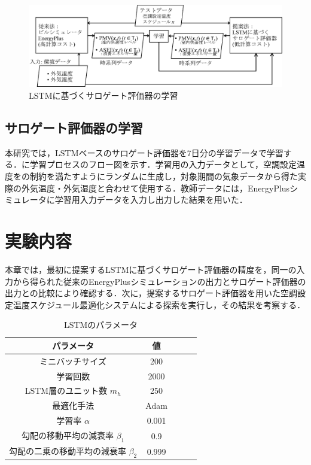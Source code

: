 \begin{figure}[ht]
  \begin{center}
    \includegraphics[width=1.1\linewidth]{fig/surrogate_learn_system.eps}
  \end{center}
  \caption{LSTMに基づくサロゲート評価器の学習}
  \label{fig::surrogate_learn_system}
\end{figure}

\subsection{サロゲート評価器の学習}
本研究では，LSTMベースのサロゲート評価器を7日分の学習データで学習する．に学習プロセスのフロー図を示す．学習用の入力データとして，空調設定温度をの制約を満たすようにランダムに生成し，対象期間の気象データから得た実際の外気温度・外気湿度と合わせて使用する．教師データには，EnergyPlusシミュレータに学習用入力データを入力し出力した結果を用いた．

\section{実験内容}
本章では，最初に提案するLSTMに基づくサロゲート評価器の精度を，同一の入力から得られた従来のEnergyPlusシミュレーションの出力とサロゲート評価器の出力との比較により確認する．次に，提案するサロゲート評価器を用いた空調設定温度スケジュール最適化システムによる探索を実行し，その結果を考察する．

\begin{table}[t]
  \begin{center}
    \caption{LSTMのパラメータ}
    \label{tab::surrogate_param_lstm}
    \begin{tabular}{c|cccc}
      \hline
      パラメータ                             & 値    \\
      \hline \hline
      ミニバッチサイズ                       & 200   \\
      学習回数                               & 2000  \\
      LSTM層のユニット数 $m_h$               & 250   \\
      最適化手法                             & Adam  \\
      学習率 $\alpha$                        & 0.001 \\
      勾配の移動平均の減衰率 $\beta_1$       & 0.9   \\
      勾配の二乗の移動平均の減衰率 $\beta_2$ & 0.999 \\
      \hline
    \end{tabular}
  \end{center}
\end{table}

